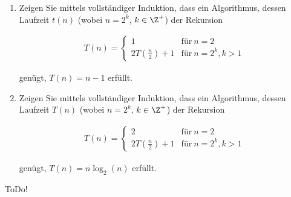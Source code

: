 
\begin{exercise}

\phantom{}

\begin{enumerate}[label = (\alph*)]

    \item Zeigen Sie mittels vollständiger Induktion, dass ein Algorithmus, dessen Laufzeit $t(n)$ (wobei $n = 2^k$, $k \in \Z^+$) der Rekursion

    \begin{align*}
        T(n)
        =
        \begin{cases}
            1                    & \text{für}~ n = 2 \\
            2T (\frac{n}{2}) + 1 & \text{für}~ n = 2^k, k > 1
        \end{cases}
    \end{align*}
    
    genügt, $T(n) = n - 1$ erfüllt.

    \item Zeigen Sie mittels vollständiger Induktion, dass ein Algorithmus, dessen Laufzeit $T(n)$ (wobei $n = 2^k$, $k \in \Z^+$) der Rekursion
    
    \begin{align*}
        T(n)
        =
        \begin{cases}
            2                    & \text{für}~ n = 2 \\
            2T (\frac{n}{2}) + 1 & \text{für}~ n = 2^k, k > 1
        \end{cases}
    \end{align*}

    genügt, $T(n) = n \log_2{(n)}$ erfüllt.

\end{enumerate}


\end{exercise}


\begin{solution}

ToDo!

\end{solution}

